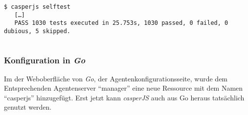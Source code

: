 \begin{verbatim}
$ casperjs selftest
   […]
   PASS 1030 tests executed in 25.753s, 1030 passed, 0 failed, 0 dubious, 5 skipped.
   
\end{verbatim}

\subsubsection*{Konfiguration in \emph{Go}}\label{konfiguration-in-go}

Im der Weboberfläche von \emph{Go}, der Agentenkonfigurationsseite,
wurde dem Entsprechenden Agentenserver ``manager'' eine neue Ressource
mit dem Namen ``casperjs'' hinzugefügt. Erst jetzt kann \emph{casperJS}
auch aus Go heraus tatsächlich genutzt werden.
